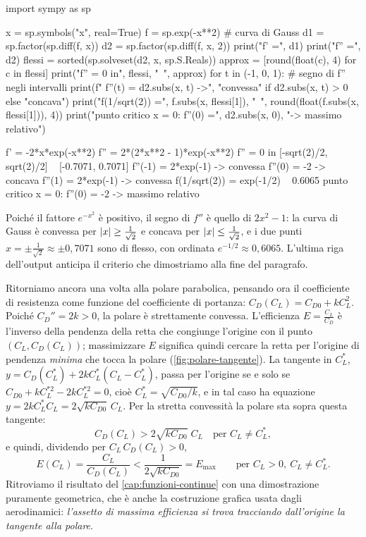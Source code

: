 \begin{python}
import sympy as sp

x = sp.symbols("x", real=True)
f = sp.exp(-x**2)                       # curva di Gauss
d1 = sp.factor(sp.diff(f, x))
d2 = sp.factor(sp.diff(f, x, 2))
print("f'  =", d1)
print("f'' =", d2)
flessi = sorted(sp.solveset(d2, x, sp.S.Reals))
approx = [round(float(c), 4) for c in flessi]
print("f'' = 0 in", flessi, "~", approx)
for t in (-1, 0, 1):              # segno di f'' negli intervalli
    print(f"  f''({t}) = {d2.subs(x, t)}  ->",
          "convessa" if d2.subs(x, t) > 0 else "concava")
print("f(1/sqrt(2)) =", f.subs(x, flessi[1]),
      "~", round(float(f.subs(x, flessi[1])), 4))
print("punto critico x = 0:  f''(0) =",
      d2.subs(x, 0), "-> massimo relativo")
\end{python}
\begin{risultato}
f'  = -2*x*exp(-x**2)
f'' = 2*(2*x**2 - 1)*exp(-x**2)
f'' = 0 in [-sqrt(2)/2, sqrt(2)/2] ~ [-0.7071, 0.7071]
  f''(-1) = 2*exp(-1)  -> convessa
  f''(0) = -2  -> concava
  f''(1) = 2*exp(-1)  -> convessa
f(1/sqrt(2)) = exp(-1/2) ~ 0.6065
punto critico x = 0:  f''(0) = -2 -> massimo relativo
\end{risultato}

Poiché il fattore $e^{-x^{2}}$ è positivo, il segno di $f''$ è quello di $2x^{2}-1$: la
curva di Gauss è convessa per $\lvert x\rvert\ge\frac1{\sqrt2}$ e concava per
$\lvert x\rvert\le\frac1{\sqrt2}$, e i due punti $x=\pm\frac1{\sqrt2}\approx\pm0{,}7071$ sono di
flesso, con ordinata $e^{-1/2}\approx0{,}6065$. L'ultima riga dell'output anticipa il
criterio che dimostriamo alla fine del paragrafo.

\begin{idea}
Ritorniamo ancora una volta alla polare parabolica, pensando ora il coefficiente di
resistenza come funzione del coefficiente di portanza:
$C_{D}(C_{L})=C_{D0}+kC_{L}^{2}$. Poiché $C_{D}''=2k>0$, la polare è strettamente
convessa. L'efficienza $E=\frac{C_{L}}{C_{D}}$ è l'inverso della pendenza della retta che
congiunge l'origine con il punto $(C_{L},C_{D}(C_{L}))$; massimizzare $E$ significa
quindi cercare la retta per l'origine di pendenza \emph{minima} che tocca la polare
(\cref{fig:polare-tangente}). La tangente in $C_{L}^{*}$,
$y=C_{D}(C_{L}^{*})+2kC_{L}^{*}(C_{L}-C_{L}^{*})$, passa per l'origine se e solo se
$C_{D0}+kC_{L}^{*2}-2kC_{L}^{*2}=0$, cioè $C_{L}^{*}=\sqrt{C_{D0}/k}$, e in tal caso ha
equazione $y=2kC_{L}^{*}C_{L}=2\sqrt{kC_{D0}}\,C_{L}$. Per la stretta convessità la polare
sta sopra questa tangente:
\[
  C_{D}(C_{L})>2\sqrt{kC_{D0}}\;C_{L} \quad\text{per } C_{L}\neq C_{L}^{*},
\]
e quindi, dividendo per $C_{L}\,C_{D}(C_{L})>0$,
\[
  E(C_{L})=\frac{C_{L}}{C_{D}(C_{L})}<\frac1{2\sqrt{kC_{D0}}}=E_{\max}
  \qquad\text{per } C_{L}>0,\ C_{L}\neq C_{L}^{*}.
\]
Ritroviamo il risultato del \cref{cap:funzioni-continue} con una dimostrazione puramente
geometrica, che è anche la costruzione grafica usata dagli aerodinamici: \emph{l'assetto
di massima efficienza si trova tracciando dall'origine la tangente alla polare}.
\end{idea}

